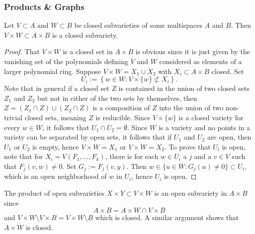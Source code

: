     \subsubsection{Products \& Graphs}
        \begin{proposition}
            Let $V\subset A$ and $W\subset B$ be closed subvarieties of some multispaces $A$ and $B$. Then $V\times W\subset A\times B$ is a closed subvariety. 
        \end{proposition}
        \begin{proof}
            That $V\times W$ is a closed set in $A\times B$ is obvious since it is just given by the vanishing set of the polynomials defining $V$ and $W$ considered as elements of a larger polynomial ring. Suppose $V\times W=X_1\cup X_2$ with $X_i\subset A\times B$ closed. Set 
            $$U_i := \left\{ w\in W: V\times \{w\}\not\subset X_i \right\}.$$
            Note that in general if a closed set $Z$ is contained in the union of two closed sets $Z_1$ and $Z_2$ but not in either of the two sets by themselves, then $Z = (Z_1\cap Z) \cup (Z_2\cap Z)$ is a composition of $Z$ into the union of two non-trivial closed sets, meaning $Z$ is reducible. Since $V\times \{w\}$ is a closed variety for every $w\in W$, it follows that $U_1\cap U_2 = \emptyset$. Since $W$ is a variety and no points in a variety can be separated by open sets, it follows that if $U_1$ and $U_2$ are open, then $U_1$ or $U_2$ is empty, hence $V\times W =X_1$ or $V\times W = X_2$. To prove that $U_i$ is open, note that for $X_i = V(F_1,\dots,F_k)$, there is for each $w\in U_i$ a $j$ and a $v\in V$ such that $F_j(v,w)\neq 0$. Set $G_j:= F_j(v,y)$. Then $w\in \{ u\in W: G_j(u)\neq 0\}\subset U_i$, which is an open neighborhood of $w$ in $U_i$, hence $U_i$ is open.  
        \end{proof}
        \begin{remark}
            The product of open subvarieties $X\times Y \subset V\times W$ is an open subvariety in $A\times B$ since 
            $$A\times B = A\times W \cap V\times B$$
            and $V\times W\setminus V\times B = V\times W\setminus B$ which is closed. A similar argument shows that $A\times W$ is closed.
        \end{remark}
